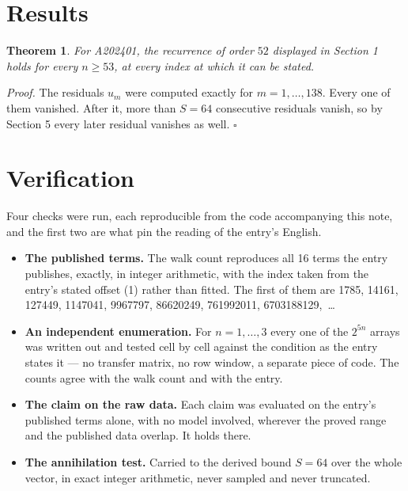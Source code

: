 \documentclass[11pt]{article}
\newtheorem{theorem}{Theorem}
\theoremstyle{definition}
\begin{document}
\section{Results}

\begin{theorem} For A202401, the recurrence of order $52$ displayed in Section 1 holds for every $n \ge 53$, at every index at which it can be stated.\end{theorem}

{\itshape Proof.} The residuals $u_m$ were computed exactly for $m = 1,\dots,138$. Every one of them vanished. After it, more than $S = 64$ consecutive residuals vanish, so by Section 5 every later residual vanishes as well. $\square$

\section{Verification}

Four checks were run, each reproducible from the code accompanying this note, and the first two are what pin the reading of the entry's English.

\begin{itemize}

\item {\bfseries The published terms.} The walk count reproduces all 16 terms the entry publishes, exactly, in integer arithmetic, with the index taken from the entry's stated offset (1) rather than fitted. The first of them are 1785, 14161, 127449, 1147041, 9967797, 86620249, 761992011, 6703188129,~\dots

\item {\bfseries An independent enumeration.} For $n = 1,\dots,3$ every one of the $2^{5n}$ arrays was written out and tested cell by cell against the condition as the entry states it --- no transfer matrix, no row window, a separate piece of code. The counts agree with the walk count and with the entry.

\item {\bfseries The claim on the raw data.} Each claim was evaluated on the entry's published terms alone, with no model involved, wherever the proved range and the published data overlap. It holds there.

\item {\bfseries The annihilation test.} Carried to the derived bound $S = 64$ over the whole vector, in exact integer arithmetic, never sampled and never truncated.

\end{itemize}
\end{document}
